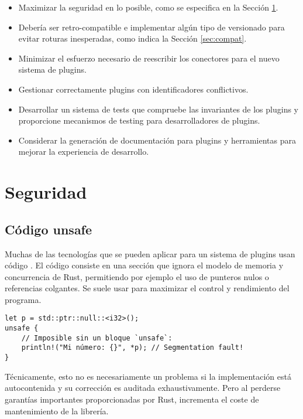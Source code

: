 \begin{itemize}
    \item Maximizar la seguridad en lo posible, como se especifica en la Sección
        \ref{sec:security}.

    \item Debería ser retro-compatible e implementar algún tipo de versionado
        para evitar roturas inesperadas, como indica la Sección
        \ref{sec:compat}.

    \item Minimizar el esfuerzo necesario de reescribir los conectores para el
        nuevo sistema de plugins.

    \item Gestionar correctamente plugins con identificadores conflictivos.

    \item Desarrollar un sistema de tests que compruebe las invariantes de los
        plugins y proporcione mecanismos de testing para desarrolladores de
        plugins.

    \item Considerar la generación de documentación para plugins y herramientas
        para mejorar la experiencia de desarrollo.

\end{itemize}

\section{Seguridad}\label{sec:security}

\subsection{Código unsafe}

Muchas de las tecnologías que se pueden aplicar para un sistema de plugins usan
código \unsafe. El código \unsafe consiste en una sección que ignora el modelo
de memoria y concurrencia de Rust, permitiendo por ejemplo el uso de punteros
nulos o referencias colgantes. Se suele usar para maximizar el control y
rendimiento del programa.

\begin{verbatim}
let p = std::ptr::null::<i32>();
unsafe {
    // Imposible sin un bloque `unsafe`:
    println!("Mi número: {}", *p); // Segmentation fault!
}
\end{verbatim}

Técnicamente, esto no es necesariamente un problema si la implementación está
autocontenida y su corrección es auditada exhaustivamente. Pero al perderse
garantías importantes proporcionadas por Rust, incrementa el coste de
mantenimiento de la librería.


